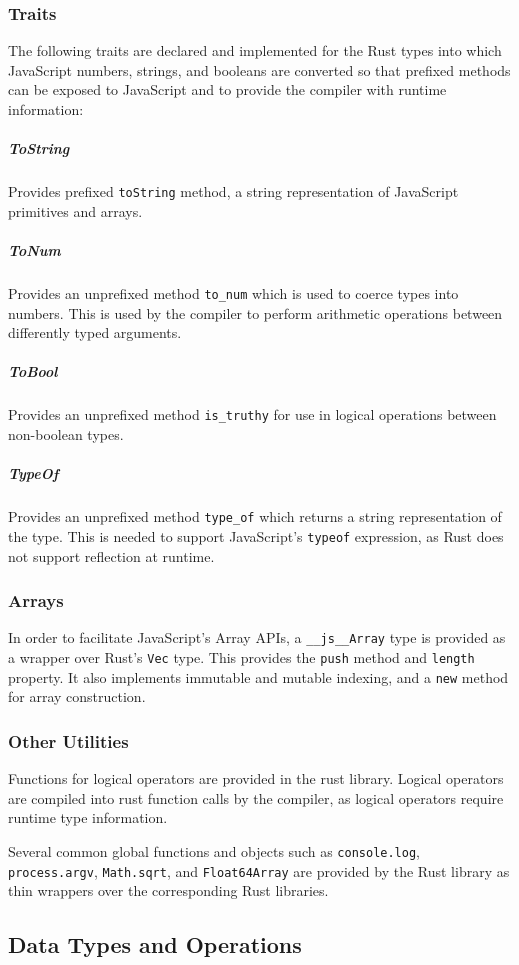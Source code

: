 \documentclass[12pt]{article}
\begin{document}
	\subsubsection{Traits}
	
	The following traits are declared and implemented for the Rust types into which JavaScript numbers, strings, and booleans are converted so that prefixed methods can be exposed to JavaScript and to provide the compiler with runtime information:
	
	\subparagraph{ToString}
	Provides prefixed \texttt{toString} method, a string representation of JavaScript primitives and arrays.
	\subparagraph{ToNum}
	Provides an unprefixed method \texttt{to\_num} which is used to coerce types into numbers. This is used by the compiler to perform arithmetic operations between differently typed arguments.
	\subparagraph{ToBool}
	Provides an unprefixed method \texttt{is\_truthy} for use in logical operations between non-boolean types.
	\subparagraph{TypeOf}
	Provides an unprefixed method \texttt{type\_of} which returns a string representation of the type. This is needed to support JavaScript's \texttt{typeof} expression, as Rust does not support reflection at runtime.
	
	\subsubsection{Arrays}
	
	In order to facilitate JavaScript's Array APIs, a \texttt{\_\_js\_\_Array} type is provided as a wrapper over Rust's \texttt{Vec} type. This provides the \texttt{push} method and \texttt{length} property. It also implements immutable and mutable indexing, and a \texttt{new} method for array construction.
	
	\subsubsection{Other Utilities}
	Functions for logical operators are provided in the rust library. Logical operators are compiled into rust function calls by the compiler, as logical operators require runtime type information.
	
	Several common global functions and objects such as \texttt{console.log}, \texttt{process.argv}, \texttt{Math.sqrt}, and \texttt{Float64Array} are provided by the Rust library as thin wrappers over the corresponding Rust libraries.
	
	\subsection{Data Types and Operations}
	
\end{document}
